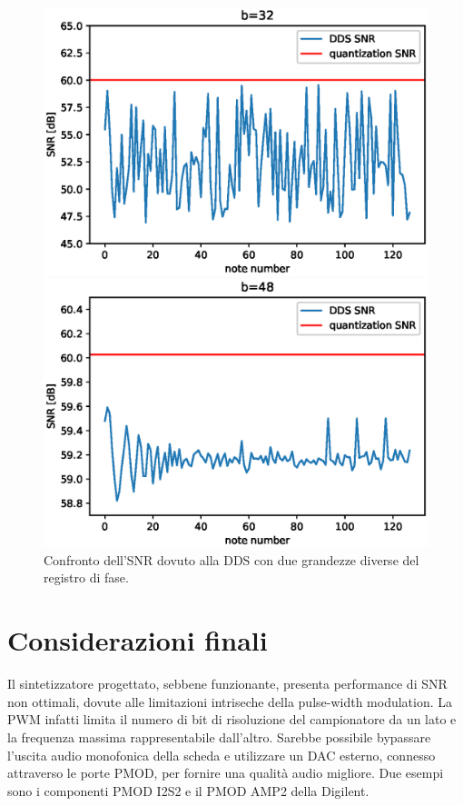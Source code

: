 \begin{figure}[H]
    \begin{minipage}{0.59\columnwidth}
            \centering
            \includegraphics[width=1.0\columnwidth]{TeX_files/dds_snr_32.eps} %
        \end{minipage}\hfill
    \begin{minipage}{0.59\columnwidth}
            \centering
            \includegraphics[width=1.0\columnwidth]{TeX_files/dds_snr_48.eps} %
    \end{minipage}
    \caption{Confronto dell'SNR dovuto alla DDS con due grandezze diverse del registro di fase.}
    \label{fig:confronto}
\end{figure}

\section{Considerazioni finali}
Il sintetizzatore progettato, sebbene funzionante, presenta performance
di SNR non ottimali, dovute alle limitazioni intriseche della pulse-width 
modulation.
La PWM infatti limita il numero di bit di risoluzione del campionatore da un lato
e la frequenza massima rappresentabile dall'altro.
Sarebbe possibile bypassare l'uscita audio monofonica della scheda
e utilizzare un DAC esterno, connesso attraverso le porte PMOD, 
per fornire una qualità audio migliore.
Due esempi sono i componenti PMOD I2S2 e il PMOD AMP2 della Digilent.

